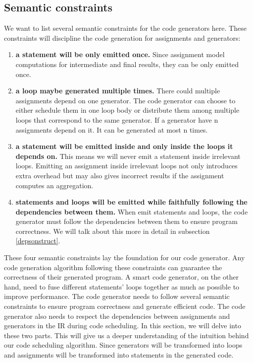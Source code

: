 \documentclass[sigplan, nonacm]{acmart}\settopmatter{printfolios=true,printccs=false,printacmref=false}
\begin{document}
\subsection[]{Semantic constraints}
We want to list several semantic constraints for the code generators here. These constraints will discipline the code generation for assignments and generators:
\begin{enumerate}
  \item \textbf{a statement will be only emitted once.} Since assignment model computations for intermediate and final results, they can be only emitted once.
  \item \textbf{a loop maybe generated multiple times.} There could multiple assignments depend on one generator. The code generator can choose to either schedule them in one loop body or distribute them among multiple loops that correspond to the same generator. If a generator have n assignments depend on it. It can be generated at most n times.
  \item \textbf{a statement will be emitted inside and only inside the loops it depends on.} This means we will never emit a statement inside irrelevant loops. Emitting an assignment inside irrelevant loops not only introduces extra overhead but may also gives incorrect results if the assignment computes an aggregation.
  \item \textbf{statements and loops will be emitted while faithfully following the dependencies between them.} When emit statements and loops, the code generator must follow the dependencies between them to ensure program correctness. We will talk about this more in detail in subsection \ref{depsonstruct}.
\end{enumerate}
These four semantic constraints lay the foundation for our code generator. Any code generation algorithm following these constraints can guarantee the correctness of their generated program. A smart code generator, on the other hand, need to fuse different statements' loops together as much as possible to improve performance.
\fi
The code generator needs to follow several semantic constraints to ensure program correctness and generate efficient code. The code generator also needs to respect the dependencies between assignments and generators in the IR during code scheduling. In this section, we will delve into these two parts. This will give us a deeper understanding of the intuition behind our code scheduling algorithm. Since generators will be transformed into loops and assignments will be transformed into statements in the generated code.\par
\end{document}
